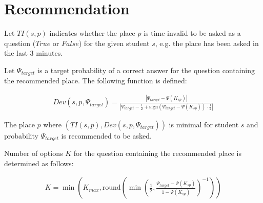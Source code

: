 \documentclass[a4paper]{article}
\begin{document}
\section{Recommendation}

Let $TI(s, p)$ indicates whether the place $p$ is time-invalid to be asked as a question ($True$ or $False$) for the given student $s$, e.g. the place has been asked in the last 3 minutes.

Let $\Psi_{target}$ is a target probability of a correct answer for the question containing the recommended place. The following function is defined:

\begin{align}
Dev(s, p, \Psi_{target}) = \frac{\left|\Psi_{target} - \Psi(K_{sp})\right|}{\left|\Psi_{target} - \frac{1}{2} + \textrm{sign}\left(\Psi_{target} - \Psi(K_{sp})\right) \cdot \frac{1}{2}\right|}
\end{align}

The place $p$ where $\left(TI(s, p), Dev(s, p, \Psi_{target})\right)$ is minimal for student $s$ and
probability $\Psi_{target}$ is recommended to be asked.

Number of options $K$ for the question containing the recommended place is determined as follows:

\begin{align}
K = \min\left(K_{max}, \textrm{round}\left(\min\left(\frac{1}{2}, \frac{\Psi_{target} - \Psi(K_{sp})}{1 - \Psi(K_{sp})}\right)^{-1}\right)\right)
\end{align}
\end{document}
